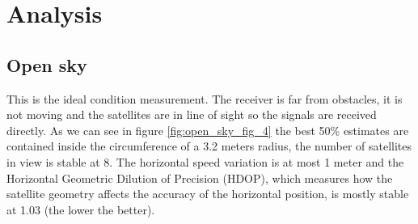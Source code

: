 \section{Analysis}
\label{sec:analysis}

\subsection{Open sky}
\label{sec:open_sky}
This is the ideal condition measurement. The receiver is far from obstacles, it is not moving and the satellites are in line of sight so the signals are received directly. As we can see in figure \ref{fig:open_sky_fig_4} the best 50\% estimates are contained inside the circumference of a 3.2 meters radius, the number of satellites in view is stable at 8. The horizontal speed variation is at most 1 meter and the Horizontal Geometric Dilution of Precision (HDOP), which measures how the satellite geometry affects the accuracy of the horizontal position, is mostly stable at 1.03 (the lower the better).

